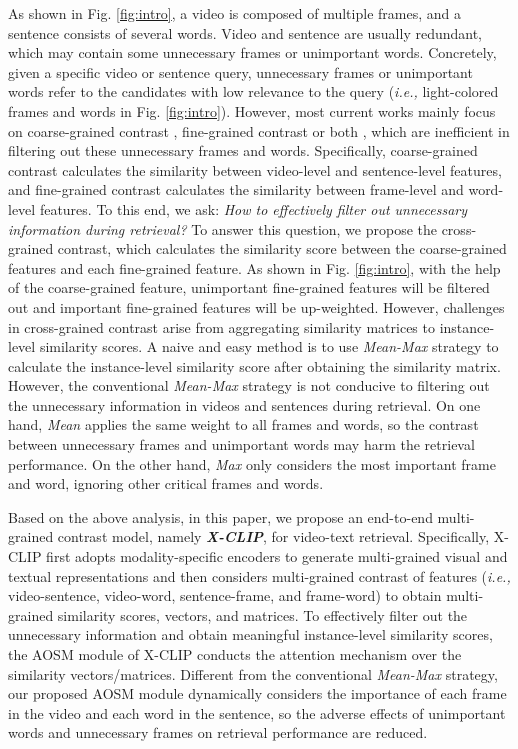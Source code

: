 \documentclass[sigconf]{acmart}
\begin{document}
As shown in Fig. \ref{fig:intro}, a video is composed of multiple frames, and a sentence consists of several words. Video and sentence are usually redundant, which may contain some unnecessary frames or unimportant words. Concretely, given a specific video or sentence query, unnecessary frames or unimportant words refer to the candidates with low relevance to the query (\emph{i.e.,} light-colored frames and words in Fig. \ref{fig:intro}). However, most current works mainly focus on coarse-grained contrast \cite{radford2021learning,luo2021clip4clip}, fine-grained contrast \cite{yao2021filip,lee2018stacked} or both \cite{yang2021taco}, which are inefficient in filtering out these unnecessary frames and words. Specifically, coarse-grained contrast calculates the similarity between video-level and sentence-level features, and fine-grained contrast calculates the similarity between frame-level and word-level features. To this end, we ask: \emph{How to effectively filter out unnecessary information during retrieval?} To answer this question, we propose the cross-grained contrast, which calculates the similarity score between the coarse-grained features and each fine-grained feature. As shown in Fig. \ref{fig:intro}, with the help of the coarse-grained feature, unimportant fine-grained features will be filtered out and important fine-grained features will be up-weighted. However, challenges in cross-grained contrast arise from aggregating similarity matrices to instance-level similarity scores. A naive and easy method is to use \emph{Mean-Max} strategy \cite{yao2021filip,khattab2020colbert,santhanam2021colbertv2,khattab2021relevance} to calculate the instance-level similarity score after obtaining the similarity matrix. However, the conventional \emph{Mean-Max} strategy is not conducive to filtering out the unnecessary information in videos and sentences during retrieval. On one hand, \emph{Mean} applies the same weight to all frames and words, so the contrast between unnecessary frames and unimportant words may harm the retrieval performance. On the other hand, \emph{Max} only considers the most important frame and word, ignoring other critical frames and words. 




Based on the above analysis, in this paper, we propose an end-to-end multi-grained contrast model, namely \emph{\textbf{X-CLIP}}, for video-text retrieval. Specifically, X-CLIP first adopts modality-specific encoders to generate multi-grained visual and textual representations and then considers multi-grained contrast of features (\emph{i.e.,} video-sentence, video-word, sentence-frame, and frame-word) to obtain multi-grained similarity scores, vectors, and matrices. To effectively filter out the unnecessary information and obtain meaningful instance-level similarity scores, the AOSM module of X-CLIP conducts the attention mechanism over the similarity vectors/matrices. Different from the conventional \emph{Mean-Max} strategy, our proposed AOSM module dynamically considers the importance of each frame in the video and each word in the sentence, so the adverse effects of unimportant words and unnecessary frames on retrieval performance are reduced.
\end{document}
